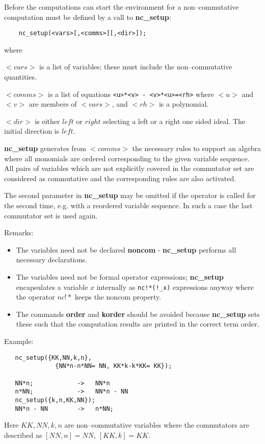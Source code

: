 Before the computations can start the environment for a
non--commutative computation must be defined by a
call to {\bf nc\_setup}:
\begin{verbatim}
    nc_setup(<vars>[,<comms>][,<dir>]);
\end{verbatim}
where

$<vars>$ is a list of variables; these must include the
non--commutative quantities.

$<comms>$ is a list of equations \verb&<u>*<v> - <v>*<u>=<rh>&
where $<u>$ and $<v>$ are members of $<vars>$, and $<rh>$ is
a polynomial.

$<dir>$ is either $left$ or $right$ selecting a left or a
right one sided ideal. The initial direction is $left$.

{\bf nc\_setup} generates from $<comms>$ the necessary
rules to support an algebra where all monomials are
ordered corresponding to the given variable sequence.
All pairs of variables which are not explicitly covered in
the commutator set are considered as commutative and the
corresponding rules are also activated.

The second parameter in {\bf nc\_setup} may be
omitted if the operator is called for the second time,
e.g. with a reordered variable sequence. In such a case
the last commutator set is used again.

Remarks: \begin{itemize}
\item The variables need not be declared {\bf noncom} -
    {\bf nc\_setup} performs all necessary declarations.
\item The variables need not be formal operator expressions;
    {\bf nc\_setup} encapsulates a variable $x$ internally
    as \verb+nc!*(!_x)+ expressions anyway where the operator $nc!*$
    keeps the noncom property.
\item The commands {\bf order} and {\bf korder} should be avoided
    because {\bf nc\_setup} sets these such that the computation
    results are printed in the correct term order.
\end{itemize}

Example:
\begin {verbatim}
   nc_setup({KK,NN,k,n},
              {NN*n-n*NN= NN, KK*k-k*KK= KK});

   NN*n;            ->   NN*n
   n*NN;            ->   NN*n - NN
   nc_setup({k,n,KK,NN});
   NN*n - NN        ->   n*NN;

\end{verbatim}
Here $KK,NN,k,n$ are non--commutative variables where
the commutators are described as $[NN,n]=NN$, $[KK,k]=KK$.


